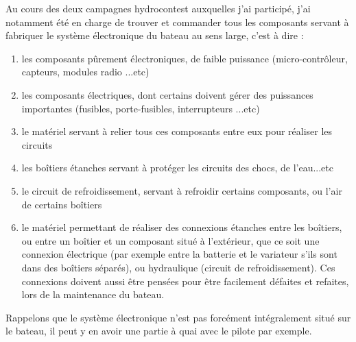 \documentclass[a4paper, 11pt]{report}
\begin{document}
Au cours des deux campagnes hydrocontest auxquelles j'ai participé,
j'ai notamment été en charge de trouver et commander tous les composants
servant à fabriquer le système électronique du bateau au sens large,
c'est à dire :
\begin{enumerate}
\item les composants pûrement électroniques, de faible puissance (micro-contrôleur,
capteurs, modules radio ...etc)
\item les composants électriques, dont certains doivent gérer des puissances
importantes (fusibles, porte-fusibles, interrupteurs ...etc)
\item le matériel servant à relier tous ces composants entre eux pour réaliser
les circuits
\item les boîtiers étanches servant à protéger les circuits des chocs, de
l'eau...etc
\item le circuit de refroidissement, servant à refroidir certains composants,
ou l'air de certains boîtiers
\item le matériel permettant de réaliser des connexions étanches entre les
boîtiers, ou entre un boîtier et un composant situé à l'extérieur,
que ce soit une connexion électrique (par exemple entre la batterie
et le variateur s'ils sont dans des boîtiers séparés), ou hydraulique
(circuit de refroidissement). Ces connexions doivent aussi être pensées
pour être facilement défaites et refaites, lors de la maintenance
du bateau.
\end{enumerate}
Rappelons que le système électronique n'est pas forcément intégralement
situé sur le bateau, il peut y en avoir une partie à quai avec le
pilote par exemple.
\end{document}
